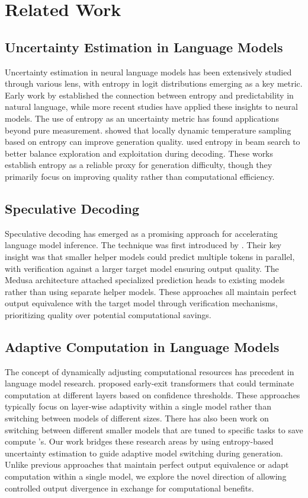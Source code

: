\section{Related Work}
\subsection{Uncertainty Estimation in Language Models}
Uncertainty estimation in neural language models has been extensively studied through various lens, with entropy in logit distributions emerging as a key metric. Early work by \cite{shannon_prediction_1951} established the connection between entropy and predictability in natural language, while more recent studies have applied these insights to neural models. The use of entropy as an uncertainty metric has found applications beyond pure measurement. \cite{holtzman_curious_2020} showed that locally dynamic temperature sampling based on entropy can improve generation quality. \cite{meister_locally_2023} used entropy in beam search to better balance exploration and exploitation during decoding. These works establish entropy as a reliable proxy for generation difficulty, though they primarily focus on improving quality rather than computational efficiency.
\subsection{Speculative Decoding}
Speculative decoding has emerged as a promising approach for accelerating language model inference. The technique was first introduced by \cite{leviathan_fast_2023}. Their key insight was that smaller helper models could predict multiple tokens in parallel, with verification against a larger target model ensuring output quality. The Medusa architecture \citep{cai_medusa_2024} attached specialized prediction heads to existing models rather than using separate helper models. These approaches all maintain perfect output equivalence with the target model through verification mechanisms, prioritizing quality over potential computational savings.
\subsection{Adaptive Computation in Language Models}
The concept of dynamically adjusting computational resources has precedent in language model research. \cite{chen_ee-llm_2024} proposed early-exit transformers that could terminate computation at different layers based on confidence thresholds. These approaches typically focus on layer-wise adaptivity within a single model rather than switching between models of different sizes. There has also been work on switching between different smaller models that are tuned to specific tasks to save compute \cite{simonds_modem_2024}'s. Our work bridges these research areas by using entropy-based uncertainty estimation to guide adaptive model switching during generation. Unlike previous approaches that maintain perfect output equivalence or adapt computation within a single model, we explore the novel direction of allowing controlled output divergence in exchange for computational benefits.